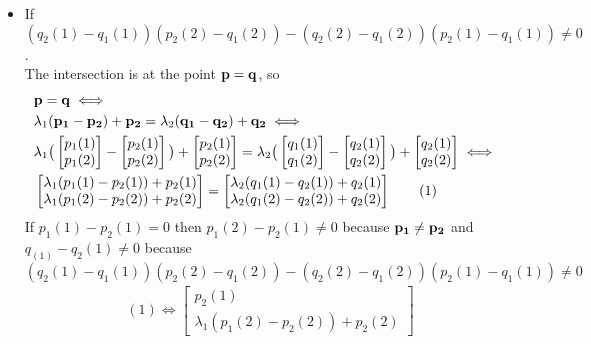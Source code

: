 \documentclass[11pt]{article}
\newcommand\numberthis{\addtocounter{equation}{1}\tag{\theequation}}
\begin{document}
\begin{enumerate}
\begin{itemize}
				\item If $(q_2(1)-q_1(1))(p_2(2)-q_1(2))-(q_2(2)-q_1(2))(p_2(1)-q_1(1))\ne 0$.\\
				The intersection is at the point ${\bf p}={\bf q}$, so
				\begin{align*}
					&{\bf p}={\bf q}\iff\\
					&\lambda_1({\bf p_1}-{\bf p_2})+{\bf p_2}=\lambda_2({\bf q_1}-{\bf q_2})+{\bf q_2}\iff \\
					&\lambda_1\big(\begin{bmatrix}
						p_1(1) \\ p_1(2)
					\end{bmatrix}-
					\begin{bmatrix}
						p_2(1) \\ p_2(2)
					\end{bmatrix}\big)+
					\begin{bmatrix}
						p_2(1) \\ p_2(2)
					\end{bmatrix}
					=\lambda_2\big(\begin{bmatrix}
						q_1(1) \\ q_1(2)
					\end{bmatrix}-
					\begin{bmatrix}
						q_2(1) \\ q_2(2)
					\end{bmatrix}\big)+
					\begin{bmatrix}
						q_2(1) \\ q_2(2)
					\end{bmatrix}\iff\\
					&\begin{bmatrix}
						\lambda_1(p_1(1)-p_2(1))+p_2(1) \\ \lambda_1(p_1(2)-p_2(2))+p_2(2)
					\end{bmatrix}=
					\begin{bmatrix}
						\lambda_2(q_1(1)-q_2(1))+q_2(1) \\ \lambda_2(q_1(2)-q_2(2))+q_2(2)
					\end{bmatrix}\numberthis
				\end{align*}
				If $p_1(1)-p_2(1)=0$ then $p_1(2)-p_2(1)\ne0$ because ${\bf p_1}\ne {\bf p_2}$ and $q_(1)-q_2(1)\ne 0$ because $(q_2(1)-q_1(1))(p_2(2)-q_1(2))-(q_2(2)-q_1(2))(p_2(1)-q_1(1))\ne 0$\\
				\begin{align*}
					&(1)\iff\begin{bmatrix}
						p_2(1) \\ \lambda_1(p_1(2)-p_2(2))+p_2(2)

\end{bmatrix}
\end{align*}
\end{itemize}
\end{enumerate}
\end{document}
